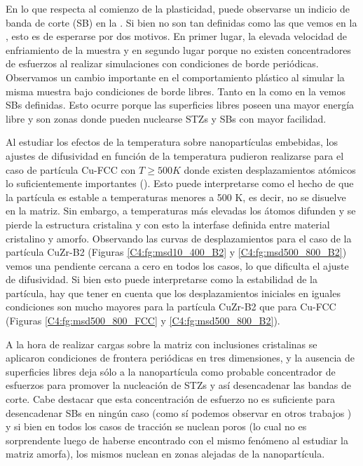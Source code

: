 En lo que respecta al comienzo de la plasticidad, puede observarse un indicio de banda de corte (SB) en la . Si bien no son tan definidas como las que vemos en la , esto es de esperarse por dos motivos. En primer lugar, la elevada velocidad de enfriamiento de la muestra y en segundo lugar porque no existen concentradores de esfuerzos al realizar simulaciones con condiciones de borde periódicas. Observamos un cambio importante en el comportamiento plástico al simular la misma muestra bajo condiciones de borde libres. Tanto en la  como en la  vemos SBs definidas. Esto ocurre porque las superficies libres poseen una mayor energía libre y son zonas donde pueden nuclearse STZs y SBs con mayor facilidad.

Al estudiar los efectos de la temperatura sobre nanopartículas embebidas, los ajustes de difusividad en función de la temperatura pudieron realizarse para el caso de partícula Cu-FCC con $T \geq 500 K$ donde existen desplazamientos atómicos lo suficientemente importantes (). Esto puede interpretarse como el hecho de que la partícula es estable a temperaturas menores a 500 K, es decir, no se disuelve en la matriz. Sin embargo, a temperaturas más elevadas los átomos difunden y se pierde la estructura cristalina y con esto la interfase definida entre material cristalino y amorfo. Observando las curvas de desplazamientos para el caso de la partícula CuZr-B2 (Figuras \ref{C4:fg:msd10_400_B2} y \ref{C4:fg:msd500_800_B2}) vemos una pendiente cercana a cero en todos los casos, lo que dificulta el ajuste de difusividad. Si bien esto puede interpretarse como la estabilidad de la partícula, hay que tener en cuenta que los desplazamientos iniciales en iguales condiciones son mucho mayores para la partícula CuZr-B2 que para Cu-FCC (Figuras \ref{C4:fg:msd500_800_FCC} y \ref{C4:fg:msd500_800_B2}).

A la hora de realizar cargas sobre la matriz con inclusiones cristalinas se aplicaron condiciones de frontera periódicas en tres dimensiones, y la ausencia de superficies libres deja sólo a la nanopartícula como probable concentrador de esfuerzos para promover la nucleación de STZs y así desencadenar las bandas de corte. Cabe destacar que esta concentración de esfuerzo no es suficiente para desencadenar SBs en ningún caso (como sí podemos observar en otros trabajos \citep{albe13,brink15,adibi13,adibi14}) y si bien en todos los casos de tracción se nuclean poros (lo cual no es sorprendente luego de haberse encontrado con el mismo fenómeno al estudiar la matriz amorfa), los mismos nuclean en zonas alejadas de la nanopartícula.

